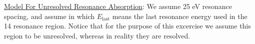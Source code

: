 \documentclass{school-22.211-notes}
\begin{document}
\uline{Model For Unresolved Resonance Absorption}: We assume 25 eV resonance spacing, and assume
in which $E_{\mathrm{last}}$ means the last resonance energy used in the 14 resonance region. Notice that for the purpose of this excercise we assume this region to be unresolved, whereas in reality they are resolved. 
\clearpage
\end{document}

